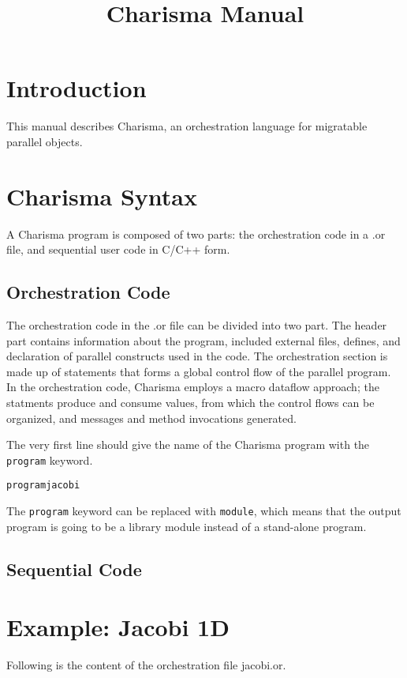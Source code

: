 \documentclass[10pt]{article}
\title{Charisma Manual}
\begin{document}
\maketitle

\section{Introduction}

This manual describes Charisma, an orchestration language for migratable
parallel objects. 

\section{Charisma Syntax}
A Charisma program is composed of two parts: the orchestration code in a .or
file, and sequential user code in C/C++ form. 

\subsection{Orchestration Code}
The orchestration code in the .or file can be divided into two part. The header
part contains information about the program, included external files, defines,
and declaration of parallel constructs used in the code. The orchestration
section is made up of statements that forms a global control flow of the
parallel program. In the orchestration code, Charisma employs a macro dataflow
approach; the statments produce and consume values, from which the control flows
can be organized, and messages and method invocations generated. 

The very first line should give the name of the Charisma program with the {\tt
program} keyword.

\begin{alltt}
    program jacobi    
\end{alltt}

The {\tt program} keyword can be replaced with {\tt module}, which means that
the output program is going to be a library module instead of a stand-alone
program. 


\subsection{Sequential Code}

\appendix

\section{Example: Jacobi 1D}
Following is the content of the orchestration file jacobi.or. 
\end{document}

